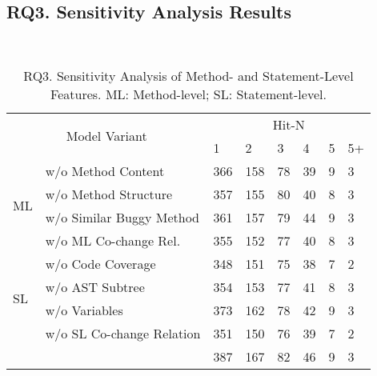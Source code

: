 \subsection{\bf RQ3. Sensitivity Analysis Results}~\label{sensi}


\begin{table}[t]
	\caption{RQ3. Sensitivity Analysis of Method- and Statement-Level Features. ML: Method-level; SL: Statement-level.}
        \vspace{-6pt}
	{\small
		\begin{center}
			\renewcommand{\arraystretch}{1}
			\begin{tabular}{p{0.3cm}<{\centering}|p{3cm}|p{0.3cm}<{\centering}|p{0.3cm}<{\centering}|p{0.2cm}<{\centering}|p{0.2cm}<{\centering}|p{0.15cm}<{\centering}|p{0.15cm}<{\centering}}
				\hline
				\multicolumn{2}{c|}{\multirow{2}{*}{Model Variant}}    & \multicolumn{6}{c}{Hit-N}\\
				\cline{3-8}
				                 \multicolumn{2}{c|}{}   &1&2&3&4&5&5+\\
				
				\hline 
				\multirow{4}{*}{ML}&w/o Method Content              & 366 & 158 & 78  & 39 & 9 & 3   \\\cline{2-8}
				&w/o	Method Structure	                        & 357 & 155 & 80  & 40 & 8 & 3   \\ \cline{2-8}
				&w/o Similar Buggy Method    	& 361 & 157 & 79  & 44 & 9 & 3   \\ \cline{2-8}
				&w/o ML Co-change Rel.         & 355 & 152 & 77  & 40 & 8 &  3   \\ \cline{2-8}
				\hline
				\multirow{4}{*}{SL}&w/o Code Coverage               & 348 & 151 & 75  & 38 & 7 & 2   \\\cline{2-8}
				&w/o	AST Subtree	        & 354 & 153 & 77  & 41 & 8 & 3   \\ \cline{2-8}
				&w/o Variables               	& 373 & 162 & 78  & 42 & 9 & 3   \\ \cline{2-8}
				&w/o SL Co-change Relation       & 351 & 150 & 76 & 39 & 7 &  2   \\ \cline{2-8}
				\hline
			&	{\tool}                           & 387 & 167 & 82  & 46 & 9 & 3  \\ \cline{2-8}
				\hline
			\end{tabular}
			
			\label{fig:rq3-1}
		\end{center}
	}
\end{table}

